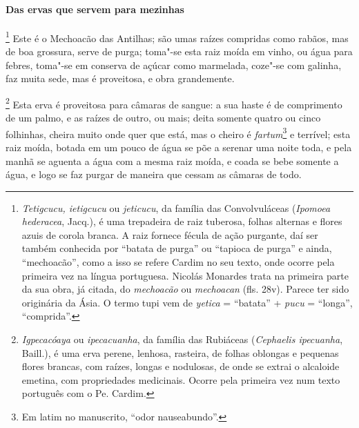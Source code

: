 \begin{linenumbers}
\paragraph{Das ervas que servem para mezinhas}\quad
{}\footnote{ \textit{Tetigcucu, ietigcucu} ou
\textit{jeticucu}, da família das Convolvuláceas (\textit{Ipomoea
hederacea}, Jacq.), é uma trepadeira de raiz tuberosa, folhas alternas e
flores azuis de corola branca. A raiz fornece fécula de ação purgante,
daí ser também conhecida por ``batata de purga'' ou ``tapioca de purga'' e
ainda, ``mechoacão'', como a isso se refere Cardim no seu texto, onde
ocorre pela primeira vez na língua portuguesa. Nicolás Monardes trata
na primeira parte da sua obra, já citada, do \textit{mechoacão} ou
\textit{mechoacan} (fls. 28v). Parece ter sido originária da Ásia. O
termo tupi vem de \textit{yetica} = ``batata'' + \textit{pucu} = ``longa'',
``comprida''.} Este é o Mechoacão das Antilhas; são umas
raízes compridas como rabãos, mas de boa grossura, serve de purga;
toma"-se esta raiz moída em vinho, ou água para febres, toma"-se em
conserva de açúcar como marmelada, coze"-se com galinha, faz muita sede,
mas é proveitosa, e obra grandemente.

\footnote{ \textit{Igpecacóaya} ou \textit{
ipecacuanha}, da família das Rubiáceas (\textit{Cephaelis ipecuanha}, Baill.),
é uma erva perene, lenhosa, rasteira, de
folhas oblongas e pequenas flores brancas, com raízes, longas e
nodulosas, de onde se extrai o alcaloide emetina, com propriedades
medicinais. Ocorre pela primeira vez num texto português com o Pe.
Cardim.} Esta erva é proveitosa para câmaras de sangue: a
sua haste é de comprimento de um palmo, e as raízes de outro, ou mais;
deita somente quatro ou cinco folhinhas, cheira muito onde quer que
está, mas o cheiro é \textit{fartum}\footnote{ Em latim no manuscrito, ``odor nauseabundo''.} e
terrível; esta raiz moída, botada em um pouco de água se põe a serenar
uma noite toda, e pela manhã se aguenta a água com a mesma raiz moída,
e coada se bebe somente a água, e logo se faz purgar de maneira que
cessam as câmaras de todo.


\end{linenumbers}
